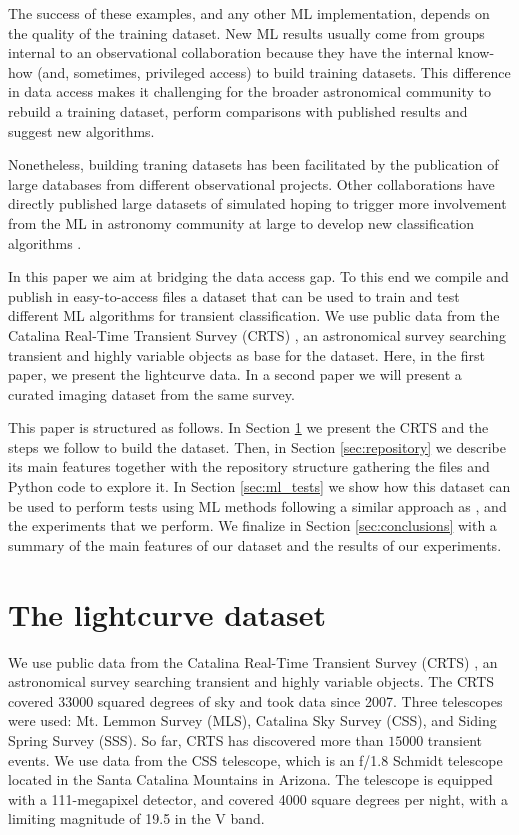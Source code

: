 \documentclass[twocolumn]{aastex62}
\begin{document}
The success of these examples, and any other ML implementation,
depends on the quality of the training dataset.
New ML results usually come from groups internal to an observational
collaboration because they have the internal know-how (and, sometimes,
privileged access) to build training datasets.
This difference in data access makes it challenging for the broader
astronomical community to rebuild a training dataset, perform comparisons with
published results and suggest new algorithms. 

Nonetheless, building traning datasets has been facilitated by the
publication of large databases from different observational projects.
Other collaborations have directly published large datasets of simulated
hoping to trigger more involvement from the ML in astronomy
community at large to develop new classification algorithms \citep{2018arXiv181000001T}.

In this paper we aim at bridging the data access gap.
To this end we compile and publish in easy-to-access files a dataset
that can be used to train and test different ML algorithms for
transient classification. 
We use public data from the Catalina Real-Time Transient Survey
(CRTS) \citep{1111.2566}, an astronomical survey searching transient
and highly variable objects as base for the dataset.
Here, in the first paper, we present the lightcurve data.
In a second paper we will present a curated imaging dataset from the same
survey.   


This paper is structured as follows.
In Section \ref{sec:data} we present the CRTS and the steps we follow
to build the dataset.
Then, in Section \ref{sec:repository} we describe its main features together
with the repository structure gathering the files and Python code to explore it. 
In Section \ref{sec:ml_tests} we show how this dataset can be used to 
perform tests using ML methods following a similar approach as \cite{1601.03931},
and the experiments that we perform. 
We finalize in Section \ref{sec:conclusions} with a summary of the
main features of our dataset and the results of our experiments. 


\section{The lightcurve dataset} 
\label{sec:data}

We use public data from the Catalina Real-Time Transient Survey
(CRTS) \citep{2009ApJ...696..870D}, an astronomical survey searching transient
and highly variable objects.
The CRTS covered 33000 squared degrees of sky and took data since 2007. 
Three telescopes were used: Mt. Lemmon Survey (MLS), Catalina Sky 
Survey (CSS), and Siding Spring Survey (SSS). So far, CRTS has 
discovered more than $15000$ transient events.
We use data from the CSS telescope, which is an f/1.8 Schmidt
telescope located in the Santa Catalina Mountains in Arizona.
The telescope is equipped with a 111-megapixel  detector, and covered
4000 square degrees per night, with a limiting magnitude of 19.5 in
the V band.  
\end{document}
